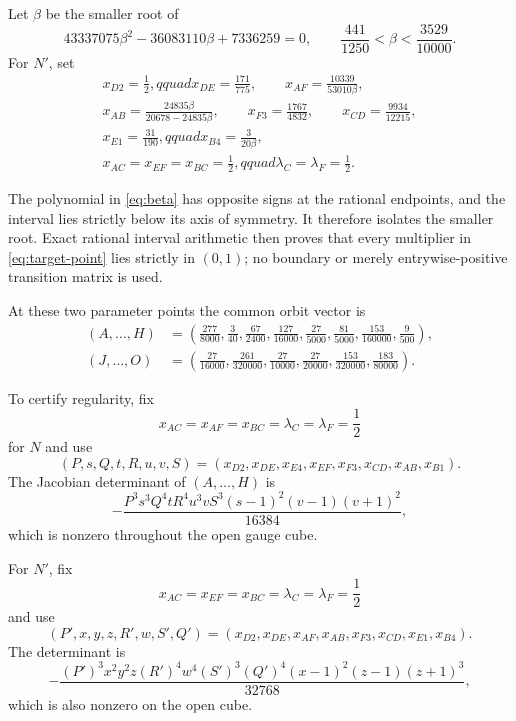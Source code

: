 \documentclass[11pt]{article}
\theoremstyle{remark}
\begin{document}
Let $\beta$ be the smaller root of
\begin{equation}\label{eq:beta}
43337075\beta^2-36083110\beta+7336259=0,
\qquad
\frac{441}{1250}<\beta<\frac{3529}{10000}.
\end{equation}
For $N'$, set
\begin{equation}\label{eq:target-point}
\begin{gathered}
x_{D2}=\frac12,qquad x_{DE}=\frac{171}{775},
\qquad x_{AF}=\frac{10339}{53010\beta},\\
x_{AB}=\frac{24835\beta}{20678-24835\beta},
\qquad x_{F3}=\frac{1767}{4832},
\qquad x_{CD}=\frac{9934}{12215},\\
x_{E1}=\frac{31}{190},qquad x_{B4}=\frac{3}{20\beta},\\
x_{AC}=x_{EF}=x_{BC}=\frac12,qquad
\lambda_C=\lambda_F=\frac12.
\end{gathered}
\end{equation}

The polynomial in \eqref{eq:beta} has opposite signs at the rational
endpoints, and the interval lies strictly below its axis of symmetry.  It
therefore isolates the smaller root.  Exact rational interval arithmetic
then proves that every multiplier in \eqref{eq:target-point} lies strictly in
$(0,1)$; no boundary or merely entrywise-positive transition matrix is used.

At these two parameter points the common orbit vector is
\begin{align}
(A,\ldots,H)&=
\left(
\frac{277}{8000},\frac3{40},\frac{67}{2400},\frac{127}{16000},
\frac{27}{5000},\frac{81}{5000},\frac{153}{160000},\frac9{500}
\right),\label{eq:first-eight}\\
(J,\ldots,O)&=
\left(
\frac{27}{16000},\frac{261}{320000},\frac{27}{10000},
\frac{27}{20000},\frac{153}{320000},\frac{183}{80000}
\right).
\label{eq:last-six}
\end{align}

To certify regularity, fix
\[
x_{AC}=x_{AF}=x_{BC}=\lambda_C=\lambda_F=\frac12
\]
for $N$ and use
\[
(P,s,Q,t,R,u,v,S)=
(x_{D2},x_{DE},x_{E4},x_{EF},x_{F3},x_{CD},x_{AB},x_{B1}).
\]
The Jacobian determinant of $(A,\ldots,H)$ is
\begin{equation}\label{eq:source-jac}
-\frac{P^3s^3Q^4tR^4u^3vS^3(s-1)^2(v-1)(v+1)^2}{16384},
\end{equation}
which is nonzero throughout the open gauge cube.

For $N'$, fix
\[
x_{AC}=x_{EF}=x_{BC}=\lambda_C=\lambda_F=\frac12
\]
and use
\[
(P',x,y,z,R',w,S',Q')=
(x_{D2},x_{DE},x_{AF},x_{AB},x_{F3},x_{CD},x_{E1},x_{B4}).
\]
The determinant is
\begin{equation}\label{eq:target-jac}
-\frac{(P')^3x^2y^2z(R')^4w^4(S')^3(Q')^4
(x-1)^2(z-1)(z+1)^3}{32768},
\end{equation}
which is also nonzero on the open cube.
\end{document}
